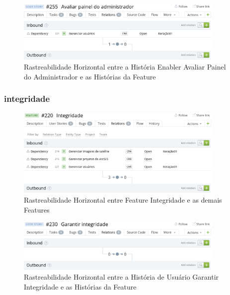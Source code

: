   \begin{figure}[!htb]
    \centering
    \includegraphics[width=10cm, keepaspectratio=false]{figuras/rastreabilidade/horizontal/gerenciar_usuario/historia_avaliar_adm.eps}
    \caption{Rastreabilidade Horizontal entre a História Enabler Avaliar Painel do Administrador e as Histórias da Feature}
  \end{figure}

  \clearpage

\subsubsection{integridade}

  \begin{figure}[!htb]
    \centering
    \includegraphics[width=10cm, keepaspectratio=false]{figuras/rastreabilidade/horizontal/integridade/feature_integridade.eps}
    \caption{Rastreabilidade Horizontal entre Feature Integridade e as demais Features}
  \end{figure}

  \begin{figure}[!htb]
    \centering
    \includegraphics[width=10cm, keepaspectratio=false]{figuras/rastreabilidade/horizontal/integridade/historia_garantir_integridade.eps}
    \caption{Rastreabilidade Horizontal entre a História de Usuário Garantir Integridade e as Histórias da Feature}
  \end{figure}

